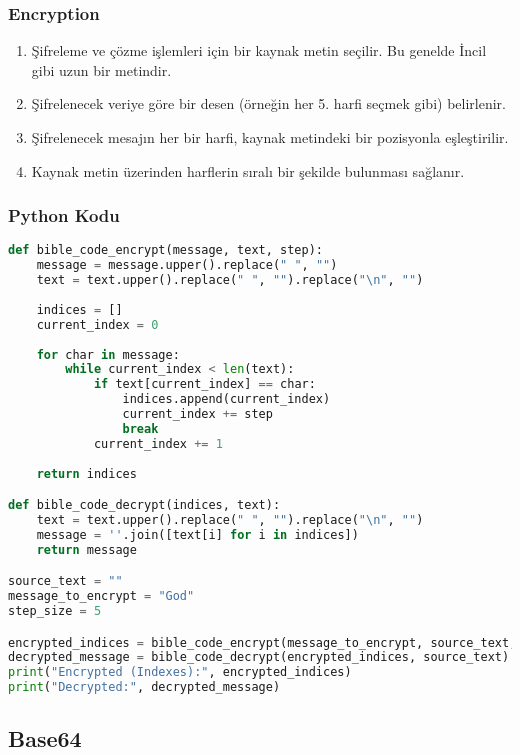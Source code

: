 \subsubsection{Encryption}

\begin{enumerate}
    \item Şifreleme ve çözme işlemleri için bir kaynak metin seçilir. Bu genelde İncil gibi uzun bir metindir.
    \item Şifrelenecek veriye göre bir desen (örneğin her 5. harfi seçmek gibi) belirlenir.
    \item Şifrelenecek mesajın her bir harfi, kaynak metindeki bir pozisyonla eşleştirilir.
    \item Kaynak metin üzerinden harflerin sıralı bir şekilde bulunması sağlanır.
\end{enumerate}

\subsubsection{Python Kodu}

\begin{lstlisting}[language=Python]
def bible_code_encrypt(message, text, step):
    message = message.upper().replace(" ", "")
    text = text.upper().replace(" ", "").replace("\n", "")
    
    indices = []
    current_index = 0
    
    for char in message:
        while current_index < len(text):
            if text[current_index] == char:
                indices.append(current_index)
                current_index += step
                break
            current_index += 1
    
    return indices

def bible_code_decrypt(indices, text):
    text = text.upper().replace(" ", "").replace("\n", "")
    message = ''.join([text[i] for i in indices])
    return message

source_text = ""
message_to_encrypt = "God"
step_size = 5

encrypted_indices = bible_code_encrypt(message_to_encrypt, source_text, step_size)
decrypted_message = bible_code_decrypt(encrypted_indices, source_text)
print("Encrypted (Indexes):", encrypted_indices)
print("Decrypted:", decrypted_message)
\end{lstlisting}

\newpage

\subsection{Base64}

